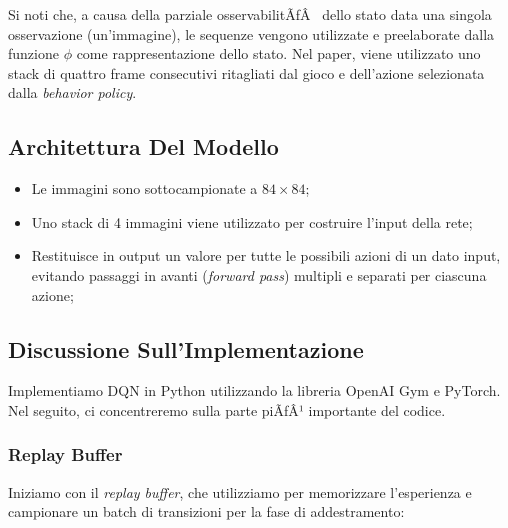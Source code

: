 ﻿\documentclass[11pt, a4paper]{report}
\begin{document}
\begin{center}
\end{center}

Si noti che, a causa della parziale osservabilitÃƒÂ  dello stato data una singola osservazione (un'immagine), le sequenze vengono utilizzate e preelaborate dalla funzione $\phi$ come rappresentazione dello stato. Nel paper, viene utilizzato uno stack di quattro frame consecutivi ritagliati dal gioco e dell'azione selezionata dalla \emph{behavior policy}.

\subsection{Architettura Del Modello}
\begin{itemize}
    \item Le immagini sono sottocampionate a $84 \times 84$;
    \item Uno stack di 4 immagini viene utilizzato per costruire l'input della rete;
    \item Restituisce in output un valore per tutte le possibili azioni di un dato input, evitando passaggi in avanti (\emph{forward pass}) multipli e separati per ciascuna azione;
\end{itemize}

\subsection{Discussione Sull'Implementazione}
Implementiamo DQN in Python utilizzando la libreria OpenAI Gym e PyTorch. Nel seguito, ci concentreremo sulla parte piÃƒÂ¹ importante del codice.

\subsubsection{Replay Buffer}
Iniziamo con il \emph{replay buffer}, che utilizziamo per memorizzare l'esperienza e campionare un batch di transizioni per la fase di addestramento:
\end{document}
